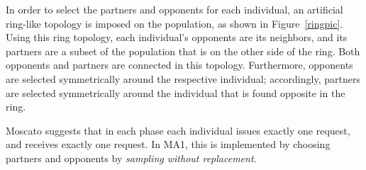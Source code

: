 \documentclass[thesis.tex]{subfiles}
\begin{document}
In order to select the partners and opponents for each individual, an artificial ring-like topology is imposed on the population, as shown in Figure~\vref{ringpic}. Using this ring topology, each individual's opponents are its neighbors, and its partners are a subset of the population that is on the other side of the ring. Both opponents and partners are connected in this topology. Furthermore, opponents are selected symmetrically around the respective individual; accordingly, partners are selected symmetrically around the individual that is found opposite in the ring.

Moscato suggests that in each phase each individual issues exactly one request, and receives exactly one request. In \gls{MA1}, this is implemented by choosing partners and opponents by \emph{sampling without replacement}.


\end{document}
